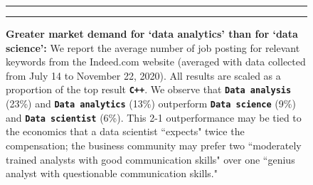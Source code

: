 \documentclass[]{article}
\begin{document}
\vskip -8.5pt




\noindent  

\begin{figure}[!ht]
 \label{fig:one-graphic}
    \begin{center}
    \end{center}
    \hrule
      \vspace{2mm}
    \caption{ \textbf{Greater market demand for `data analytics' than for `data science':} \newline \footnotesize{ We report the average number of job posting for relevant keywords from the Indeed.com website (averaged with data collected from July 14 to November 22, 2020).  \newline \newline  All results are scaled as a proportion of the top result \textbf{\tt{C++}}. We observe that \textbf{\tt{Data analysis}} (23\%) and \textbf{\tt{Data analytics}} (13\%) outperform \textbf{\tt{Data science}} (9\%) and \textbf{\tt{Data scientist}} (6\%).  \newline \newline This 2-1 outperformance may be tied to the economics that a data scientist ``expects" twice the compensation; the business community may prefer two ``moderately trained analysts with good communication skills" over one ``genius analyst with questionable communication skills."  \newline {}}  }
    \vspace{2mm}
    \hrule
\end{figure}
\end{document}

